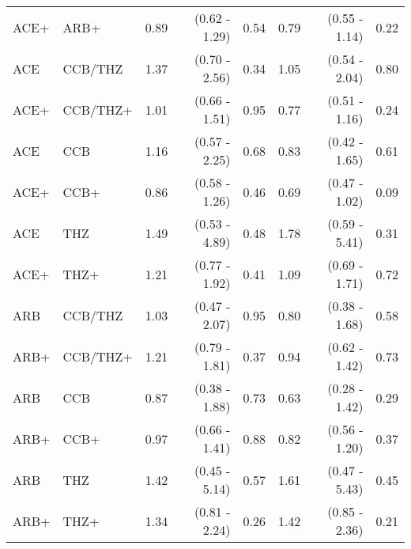 \documentclass[11pt,]{article}
\begin{document}
\begin{table}[H]
{\begin{tabular}{llrrrrrr}
  ACE+ & ARB+ & 0.89 & (0.62 - 1.29) & 0.54 & 0.79 & (0.55 - 1.14) & 0.22 \\ 
  ACE & CCB/THZ & 1.37 & (0.70 - 2.56) & 0.34 & 1.05 & (0.54 - 2.04) & 0.80 \\ 
  ACE+ & CCB/THZ+ & 1.01 & (0.66 - 1.51) & 0.95 & 0.77 & (0.51 - 1.16) & 0.24 \\ 
  ACE & CCB & 1.16 & (0.57 - 2.25) & 0.68 & 0.83 & (0.42 - 1.65) & 0.61 \\ 
  ACE+ & CCB+ & 0.86 & (0.58 - 1.26) & 0.46 & 0.69 & (0.47 - 1.02) & 0.09 \\ 
  ACE & THZ & 1.49 & (0.53 - 4.89) & 0.48 & 1.78 & (0.59 - 5.41) & 0.31 \\ 
  ACE+ & THZ+ & 1.21 & (0.77 - 1.92) & 0.41 & 1.09 & (0.69 - 1.71) & 0.72 \\ 
  ARB & CCB/THZ & 1.03 & (0.47 - 2.07) & 0.95 & 0.80 & (0.38 - 1.68) & 0.58 \\ 
  ARB+ & CCB/THZ+ & 1.21 & (0.79 - 1.81) & 0.37 & 0.94 & (0.62 - 1.42) & 0.73 \\ 
  ARB & CCB & 0.87 & (0.38 - 1.88) & 0.73 & 0.63 & (0.28 - 1.42) & 0.29 \\ 
  ARB+ & CCB+ & 0.97 & (0.66 - 1.41) & 0.88 & 0.82 & (0.56 - 1.20) & 0.37 \\ 
  ARB & THZ & 1.42 & (0.45 - 5.14) & 0.57 & 1.61 & (0.47 - 5.43) & 0.45 \\ 
  ARB+ & THZ+ & 1.34 & (0.81 - 2.24) & 0.26 & 1.42 & (0.85 - 2.36) & 0.21 \\ 
    \bottomrule
  \end{tabular}
  }
\end{table}
\end{document}
